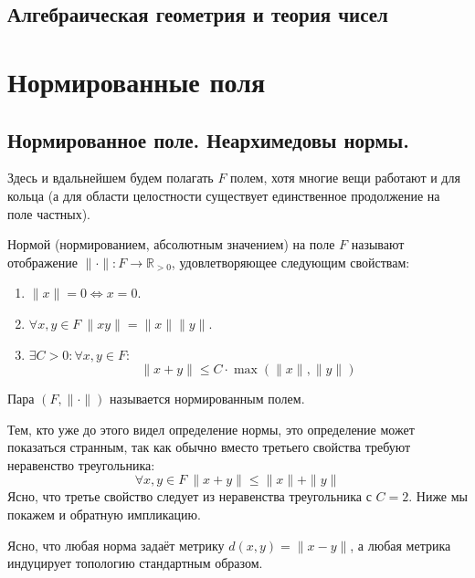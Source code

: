 \documentclass[11pt]{article}
\begin{document}
    
    \begin{center}
        \section*{Алгебраическая геометрия и теория чисел}
    \end{center}
    \tableofcontents
    \newpage

    \section{Нормированные поля}
    \subsection{Нормированное поле. Неархимедовы нормы.}
    Здесь и вдальнейшем будем полагать $F$ полем, хотя многие вещи работают и для кольца (а для области целостности существует
    единственное продолжение на поле частных).

    \begin{definition}\label{fieldnorm}
     Нормой (нормированием, абсолютным значением) на поле $F$  называют отображение $\| \cdot \|\colon F \to \mathbb{R}_{> 0}$,
        удовлетворяющее следующим свойствам:
        \begin{enumerate}
            \item $\| x \| = 0 \Leftrightarrow x = 0$.

            \item $\forall x, y \in F \ \| x y \| = \| x \| \| y \| $.

            \item $\exists C > 0\colon \forall x, y \in F\colon$
            \[ \| x + y \| \le C \cdot \max(\| x \|, \| y \| ) \]
        \end{enumerate}
        Пара $(F, \| \cdot \|)$ называется нормированным полем.
    \end{definition}
    \begin{remark}
        Тем, кто уже до этого видел определение нормы, это определение может показаться странным, так как обычно вместо третьего свойства
        требуют неравенство треугольника:
        \[ \forall x, y \in F \ \| x + y \| \le \| x \| + \| y \| \]
        Ясно, что третье свойство следует из неравенства треугольника с $C = 2$. Ниже мы покажем и обратную импликацию.
    \end{remark}

    Ясно, что любая норма задаёт метрику $d(x, y) = \| x - y \|$, а любая метрика индуцирует топологию стандартным образом.
\end{document}
